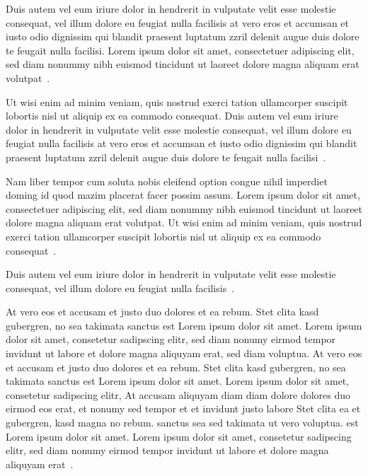 Duis autem vel eum iriure dolor in hendrerit in vulputate velit esse molestie
consequat, vel illum dolore eu feugiat nulla facilisis at vero eros et accumsan
et iusto odio dignissim qui blandit praesent luptatum zzril delenit augue duis
dolore te feugait nulla facilisi. Lorem ipsum dolor sit amet, consectetuer
adipiscing elit, sed diam nonummy nibh euismod tincidunt ut laoreet dolore
magna aliquam erat volutpat~\cite{hand:twist}.

Ut wisi enim ad minim veniam, quis nostrud exerci tation ullamcorper suscipit
lobortis nisl ut aliquip ex ea commodo consequat. Duis autem vel eum iriure
dolor in hendrerit in vulputate velit esse molestie consequat, vel illum dolore
eu feugiat nulla facilisis at vero eros et accumsan et iusto odio dignissim qui
blandit praesent luptatum zzril delenit augue duis dolore te feugait nulla
facilisi~\cite{hart:famtp}.

Nam liber tempor cum soluta nobis eleifend option congue nihil imperdiet doming
id quod mazim placerat facer possim assum. Lorem ipsum dolor sit amet,
consectetuer adipiscing elit, sed diam nonummy nibh euismod tincidunt ut laoreet
dolore magna aliquam erat volutpat. Ut wisi enim ad minim veniam, quis nostrud
exerci tation ullamcorper suscipit lobortis nisl ut aliquip ex ea commodo
consequat~\cite{harv:mlhns}.

Duis autem vel eum iriure dolor in hendrerit in vulputate velit esse molestie
consequat, vel illum dolore eu feugiat nulla facilisis~\cite{hill:sadfn}.

At vero eos et accusam et justo duo dolores et ea rebum. Stet clita kasd
gubergren, no sea takimata sanctus est Lorem ipsum dolor sit amet. Lorem ipsum
dolor sit amet, consetetur sadipscing elitr,  sed diam nonumy eirmod tempor
invidunt ut labore et dolore magna aliquyam erat, sed diam voluptua. At vero
eos et accusam et justo duo dolores et ea rebum. Stet clita kasd gubergren, no
sea takimata sanctus est Lorem ipsum dolor sit amet. Lorem ipsum dolor sit
amet, consetetur sadipscing elitr,  At accusam aliquyam diam diam dolore
dolores duo eirmod eos erat, et nonumy sed tempor et et invidunt justo labore
Stet clita ea et gubergren, kasd magna no rebum. sanctus sea sed takimata ut
vero voluptua. est Lorem ipsum dolor sit amet. Lorem ipsum dolor sit amet,
consetetur sadipscing elitr,  sed diam nonumy eirmod tempor invidunt ut labore
et dolore magna aliquyam erat~\cite{hu:tdaeo}.

